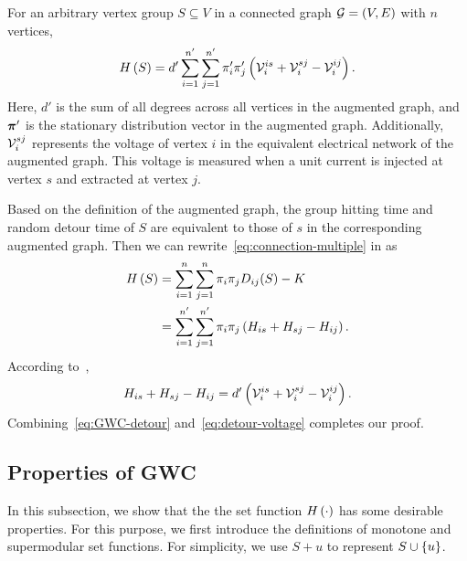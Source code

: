 \documentclass[10pt,twocolumn,twoside]{IEEEtran}
\begin{document}
\begin{theorem}\label{thm:connection-electrical}
    For an arbitrary vertex group \(S\subseteq V\) in a connected graph \(\mathcal{G}=(V,E)\) with \(n\) vertices,
    \begin{equation}\label{eq:connection-electrical}
        H\left(S\right)=d'\sum_{i=1}^{n'}\sum_{j=1}^{n'}\pi'_i\pi'_j\left( \mathcal{V}_i^{is}+\mathcal{V}_i^{sj}-\mathcal{V}_i^{ij} \right).
    \end{equation}
    Here, \(d'\) is the sum of all degrees across all vertices in the augmented graph, and \(\boldsymbol{\pi}'\) is the stationary distribution vector in the augmented graph.
    Additionally, \(\mathcal{V}_i^{sj}\) represents the voltage of vertex \(i\) in the equivalent electrical network of the augmented graph.
    This voltage is measured when a unit current is injected at vertex \(s\) and extracted at vertex \(j\).
\end{theorem}
\begin{IEEEproof}
    Based on the definition of the augmented graph, the group hitting time and random detour time of \(S\) are equivalent to those of \(s\) in the corresponding augmented graph.
    Then we can rewrite~\eqref{eq:connection-multiple} in  as
    \begin{equation}\label{eq:GWC-detour}
        \begin{split}
            H\left(S\right)&=\sum_{i=1}^n\sum_{j=1}^n\pi_i\pi_jD_{ij}(S)-K\\
            &=\sum_{i=1}^{n'}\sum_{j=1}^{n'}\pi_i\pi_j\left( H_{is}+H_{sj}-H_{ij} \right).
        \end{split}
    \end{equation}
    According to~\cite{RaZh13},
    \begin{equation}\label{eq:detour-voltage}
        H_{is}+H_{sj}-H_{ij}=d'\left( \mathcal{V}_i^{is}+\mathcal{V}_i^{sj}-\mathcal{V}_i^{ij} \right).
    \end{equation}
    Combining~\eqref{eq:GWC-detour} and~\eqref{eq:detour-voltage} completes our proof.
\end{IEEEproof}


\subsection{Properties of GWC}

In this subsection, we show that the the set function \(H\left(\cdot\right)\) has some desirable properties. For this purpose, we first introduce the definitions of monotone and supermodular set functions. For simplicity, we use \(S+u\) to represent \(S\cup\left\{u \right\}\).
\end{document}
